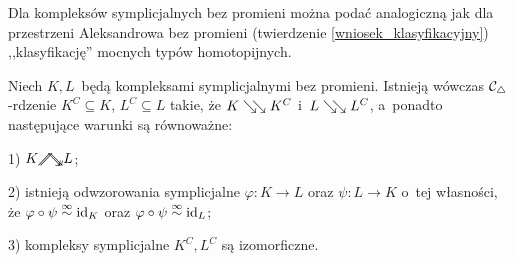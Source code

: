 Dla kompleksów symplicjalnych bez promieni można podać analogiczną jak dla przestrzeni Aleksandrowa bez promieni (twierdzenie \ref{wniosek_klasyfikacyjny}) ,,klasyfikację'' mocnych typów homotopijnych. 

\begin{stw}\label{stw-charakteryzacja_mocnego_typu_homotopijnego_przez_rdzenie}
Niech $K,L$~będą kompleksami symplicjalnymi bez promieni. Istnieją wówczas $\mathcal{C}_\triangle$-rdzenie $K^C\subseteq K$, $L^C\subseteq L$ takie, że $K\searrow\!\!\searrow K^C$ i~$L\searrow\!\!\searrow L^C$, a~ponadto następujące warunki są równoważne:
\begin{compactenum}
\item[1)] $K\stronghe L$;
\item[2)] istnieją odwzorowania symplicjalne $\varphi\colon K\to L$ oraz $\psi\colon L\to K$ o~tej własności, że $\varphi\circ\psi\stackrel{\infty}{\sim}\operatorname{id}_K$ oraz $\varphi\circ\psi\stackrel{\infty}{\sim}\operatorname{id}_L$;
\item[3)] kompleksy symplicjalne $K^C,L^C$ są izomorficzne.
\end{compactenum}
\end{stw}
